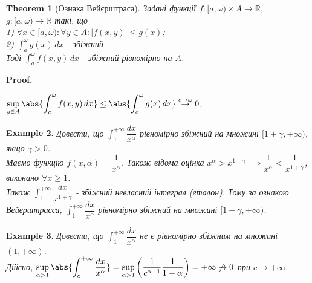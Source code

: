 \documentclass[a4paper, 10pt]{article}
\makeatletter
\def\huge{\displaystyle}
\def\qed{$\blacksquare$}
\theoremstyle{theoremdd}
\newtheorem{theorem}{Theorem}[subsection]
\theoremstyle{theoremdd}
\theoremstyle{theoremdd}
\theoremstyle{theoremdd}
\theoremstyle{theoremdd}
\newtheorem{example}[theorem]{Example}
\theoremstyle{theoremdd}
\theoremstyle{theoremdd}
\theoremstyle{theoremdd}
\theoremstyle{theoremdd}
\renewenvironment{proof}[1][Proof.\\]{\par
\pushQED{\hfill \qed}%
\normalfont \topsep6\p@\@plus6\p@\relax
\trivlist
\item\relax
{\bfseries
#1\@addpunct{.}}\hspace\labelsep\ignorespaces
}{%
\popQED\endtrivlist\@endpefalse
}
\makeatother
\begin{document}
\begin{theorem}[Ознака Вейєрштраса]
Задані функції $f: [a,\omega) \times A \to \mathbb{R}$, $g: [a,\omega) \to \mathbb{R}$ такі, що\\
1) $\forall x \in [a,\omega): \forall y \in A: |f(x,y)| \leq g(x)$;\\
2) $\huge \int_a^\omega g(x)\,dx$ - збіжний.\\
Тоді $\huge \int_a^\omega f(x,y)\,dx$ - збіжний рівномірно на $A$.
\end{theorem}

\begin{proof}
$\huge \sup_{y \in A} \abs{\int_c^\omega f(x,y)\,dx} \leq \abs{\int_c^\omega g(x)\,dx} \overset{c \to \omega}{\to} 0$.
\end{proof}

\begin{example}
Довести, що $\huge\int_1^{+\infty} \dfrac{dx}{x^\alpha}$ рівномірно збіжний на множині $[1+\gamma,+\infty)$, якщо $\gamma > 0$.\\
Маємо функцію $f(x,\alpha) = \dfrac{1}{x^\alpha}$. Також відома оцінка $x^\alpha > x^{1+\gamma} \implies \dfrac{1}{x^\alpha} < \dfrac{1}{x^{1+\gamma}}$, виконано $\forall x \geq 1$.\\
Також $\huge\int_1^{+\infty} \dfrac{dx}{x^{1+\gamma}}$ - збіжний невласний інтеграл (еталон). Тому за ознакою Вейєрштрасса, $\huge\int_1^{+\infty} \dfrac{dx}{x^\alpha}$ рівномірно збіжний на множині $[1+\gamma,+\infty)$.
\end{example}

\begin{example}
Довести, що $\huge\int_1^{+\infty} \dfrac{dx}{x^\alpha}$ не є рівномірно збіжним на множині $(1,+\infty)$.\\
Дійсно, $\huge\sup_{\alpha > 1} \abs{\int_c^{+\infty} \dfrac{dx}{x^\alpha}} = \sup_{\alpha >1} \left(\dfrac{1}{c^{\alpha-1}} \dfrac{1}{1-\alpha}\right) = +\infty \not\to 0$ при $c \to +\infty$.
\end{example}
\end{document}
